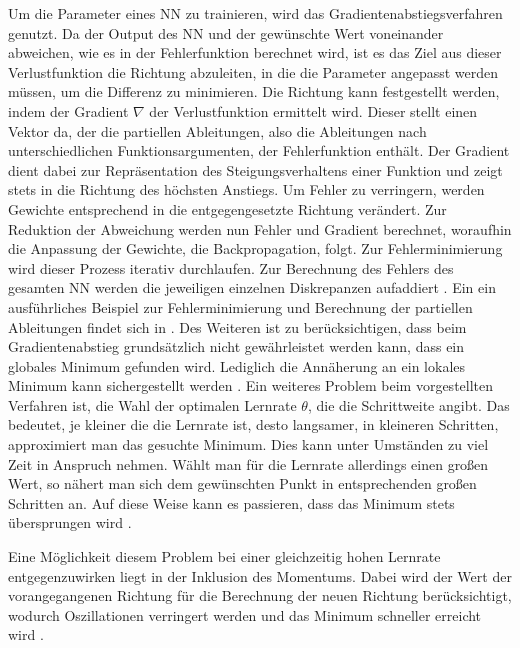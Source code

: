 \documentclass[12pt,a4paper]{article}
\begin{document}
Um die Parameter eines NN zu trainieren, wird das Gradientenabstiegsverfahren genutzt. Da der Output des NN und der gewünschte Wert voneinander abweichen, wie es in der Fehlerfunktion berechnet wird, ist es das Ziel aus dieser Verlustfunktion die Richtung abzuleiten, in die die Parameter angepasst werden müssen, um die Differenz zu minimieren. Die Richtung kann festgestellt werden, indem der Gradient $ \nabla $ der Verlustfunktion ermittelt wird. Dieser stellt einen Vektor da, der die partiellen Ableitungen, also die Ableitungen nach unterschiedlichen Funktionsargumenten, der Fehlerfunktion enthält. Der Gradient dient dabei zur Repräsentation des Steigungsverhaltens einer Funktion und zeigt stets in die Richtung des höchsten Anstiegs. Um Fehler zu verringern, werden Gewichte entsprechend in die entgegengesetzte Richtung verändert. Zur Reduktion der Abweichung werden nun Fehler und Gradient berechnet, woraufhin die Anpassung der Gewichte, die Backpropagation, folgt. Zur Fehlerminimierung wird dieser Prozess iterativ durchlaufen. Zur Berechnung des Fehlers des gesamten NN werden die jeweiligen einzelnen Diskrepanzen aufaddiert \cite[S. 58-60]{Kruse2015}. Ein ein ausführliches Beispiel zur Fehlerminimierung und Berechnung der partiellen Ableitungen findet sich in \cite[S. 64-68]{Kruse2015}.
Des Weiteren ist zu berücksichtigen, dass beim Gradientenabstieg grundsätzlich nicht gewährleistet werden kann, dass ein globales Minimum gefunden wird. Lediglich die Annäherung an ein lokales Minimum kann sichergestellt werden \cite[S. 69]{Kruse2015}. Ein weiteres Problem beim vorgestellten Verfahren ist, die Wahl der optimalen Lernrate $ \theta $, die die Schrittweite angibt. Das bedeutet, je kleiner die die Lernrate ist, desto langsamer, in kleineren Schritten, approximiert man das gesuchte Minimum. Dies kann unter Umständen zu viel Zeit in Anspruch nehmen. Wählt man für die Lernrate allerdings einen großen Wert, so nähert man sich dem gewünschten Punkt in entsprechenden großen Schritten an. Auf diese Weise kann es passieren, dass das Minimum stets übersprungen wird \cite[S. 67]{Kruse2015}. 

Eine Möglichkeit diesem Problem bei einer gleichzeitig hohen Lernrate entgegenzuwirken liegt in der Inklusion des Momentums. Dabei wird der Wert der vorangegangenen Richtung für die Berechnung der neuen Richtung berücksichtigt, wodurch Oszillationen verringert werden und das Minimum schneller erreicht wird \cite{Rumelhart1985}.
\end{document}
